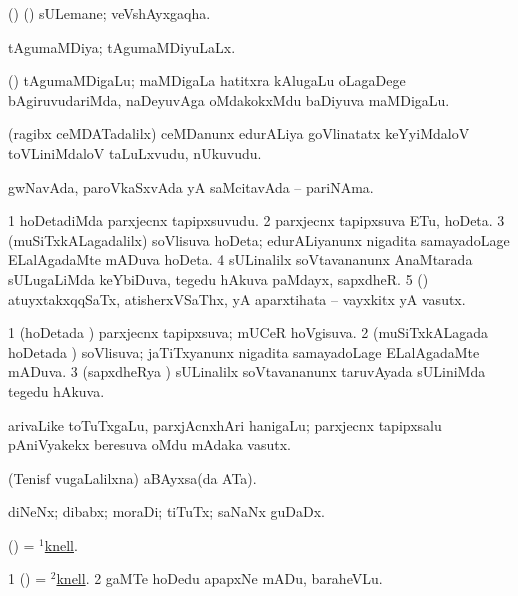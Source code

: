 \bentry
{}
\gl{\nA}
\bmng
(\birx) (\ashi) sULemane; veVshAyxgaqha. 
\emng
\eentry

\bentry
{}
\gl{\gu}
\bmng
tAgumaMDiya; tAgumaMDiyuLaLx. 
\emng
\eentry

\bentry
{}
\gl{\nA}
\bmng
(\bava) tAgumaMDigaLu; maMDigaLa hatitxra kAlugaLu oLagaDege bAgiruvudariMda, naDeyuvAga oMdakokxMdu baDiyuva maMDigaLu. 
\emng
\eentry

\bentry
{}
\gl{\nA}
\bmng
(ragibx ceMDATadalilx) ceMDanunx edurALiya goVlinatatx keYyiMdaloV toVLiniMdaloV taLuLxvudu, nUkuvudu. 
\emng
\eentry

\bentry
{}
\gl{\nA}
\bmng
gwNavAda, paroVkaSxvAda yA saMcitavAda -- pariNAma. 
\emng
\eentry

\bentry
{}
\gl{\nA}
\bmng
\bnum
\num{1} hoDetadiMda parxjecnx tapipxsuvudu. 
\num{2} parxjecnx tapipxsuva ETu, hoDeta. 
\num{3} (muSiTxkALagadalilx) soVlisuva hoDeta; edurALiyanunx nigadita samayadoLage ELalAgadaMte mADuva hoDeta. 
\num{4} sULinalilx soVtavananunx AnaMtarada sULugaLiMda keYbiDuva, tegedu hAkuva paMdayx, sapxdheR. 
\num{5} (\AmA) atuyxtakxqqSaTx, atisherxVSaThx, yA aparxtihata -- vayxkitx yA vasutx. 
\enum
\emng
\eentry

\bentry
{}
\gl{\gu}
\bmng
\bnum
\num{1} (hoDetada \vi) parxjecnx tapipxsuva; mUCeR hoVgisuva. 
\num{2} (muSiTxkALagada hoDetada \vi) soVlisuva; jaTiTxyanunx nigadita samayadoLage ELalAgadaMte mADuva. 
\num{3} (sapxdheRya \vi) sULinalilx soVtavananunx taruvAyada sULiniMda tegedu hAkuva. 
\enum
\emng
\eentry

\bentry
{}
\gl{\nA}
\bmng
arivaLike toTuTxgaLu, parxjAcnxhAri hanigaLu; parxjecnx tapipxsalu pAniVyakekx beresuva oMdu mAdaka vasutx. 
\emng
\eentry

\bentry
{}
\gl{\nA}
\bmng
(Tenisf \mo vugaLalilxna) aBAyxsa(da ATa). 
\emng
\eentry

\bentry
{}
\gl{\nA}
\bmng
diNeNx; dibabx; moraDi; tiTuTx; saNaNx guDaDx. 
\emng
\eentry

\bentry
{}
\gl{\nA}
\bmng
(\pArxparx)  = \hyperlink{knell(1)}{$^1$knell}. 
\emng
\eentry

\bentry
{}
\gl{\sakirx}
\bmng
\bnum
\num{1} (\pArxparx)  = \hyperlink{knell(2)}{$^2$knell}. 
\num{2} gaMTe hoDedu apapxNe mADu, baraheVLu. 
\enum
\emng
\eentry

